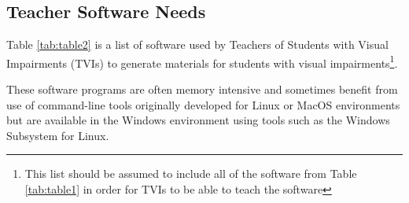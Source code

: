 \documentclass[12pt,letterpaper,twoside]{extreport}
\begin{document}
\pagebreak \hypertarget{teacher-software-needs}{}\subsection{Teacher Software Needs}\label{teacher-software-needs}
Table \ref{tab:table2} is a list of software used by Teachers of Students with Visual Impairments (TVIs) to generate materials for students with visual impairments\footnote{This list should be assumed to include all of the software from Table \ref{tab:table1} in order for TVIs to be able to teach the software}.

These software programs are often memory intensive and sometimes benefit from use of command-line tools originally developed for Linux or MacOS environments but are available in the Windows environment using tools such as the Windows Subsystem for Linux.
\end{document}
